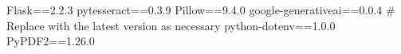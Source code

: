 Flask==2.2.3
pytesseract==0.3.9
Pillow==9.4.0
google-generativeai==0.0.4  # Replace with the latest version as necessary
python-dotenv==1.0.0
PyPDF2==1.26.0
